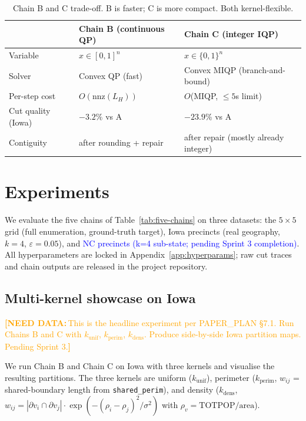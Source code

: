 \documentclass[11pt]{article}
\newcommand{\needdata}[1]{\textcolor{orange}{\textbf{[NEED DATA:}\,#1\textbf{]}}}
\newcommand{\draft}[1]{\textcolor{blue}{#1}}
\begin{document}
\begin{table}[H]
\centering
\small
\begin{tabular}{lll}
\toprule
 & Chain B (continuous QP) & Chain C (integer IQP) \\
\midrule
Variable & $x \in [0,1]^n$ & $x \in \{0,1\}^n$ \\
Solver & Convex QP (fast) & Convex MIQP (branch-and-bound) \\
Per-step cost & $O(\text{nnz}(L_H))$ & $O$(MIQP, $\le 5$s limit) \\
Cut quality (Iowa) & $-3.2\%$ vs A & $-23.9\%$ vs A \\
Contiguity & after rounding + repair & after repair (mostly already integer) \\
\bottomrule
\end{tabular}
\caption{Chain B and C trade-off. B is faster; C is more compact.
  Both kernel-flexible.}\label{tab:b-vs-c}
\end{table}

\section{Experiments}\label{sec:experiments}

We evaluate the five chains of Table~\ref{tab:five-chains} on three
datasets: the $5 \times 5$ grid (full enumeration, ground-truth
target), Iowa precincts (real geography, $k = 4$, $\varepsilon = 0.05$),
and \draft{NC precincts (k=4 sub-state; pending Sprint 3
completion)}. All hyperparameters are locked in
Appendix~\ref{app:hyperparams}; raw cut traces and chain outputs are
released in the project repository.

\subsection{Multi-kernel showcase on Iowa}\label{sec:exp-multikernel}

\needdata{This is the headline experiment per PAPER\_PLAN \S7.1. Run
Chains B and C with $k_{\mathrm{unif}}$, $k_{\mathrm{perim}}$,
$k_{\mathrm{dens}}$. Produce side-by-side Iowa partition maps.
Pending Sprint 3.}

We run Chain B and Chain C on Iowa with three kernels and visualise
the resulting partitions. The three kernels are uniform
($k_{\mathrm{unif}}$), perimeter ($k_{\mathrm{perim}}$,
$w_{ij}$ = shared-boundary length from \texttt{shared\_perim}), and
density ($k_{\mathrm{dens}}$, $w_{ij} = |\partial v_i \cap \partial v_j| \cdot \exp(-(\rho_i - \rho_j)^2 / \sigma^2)$
with $\rho_v = \mathrm{TOTPOP}/\mathrm{area}$).
\end{document}
